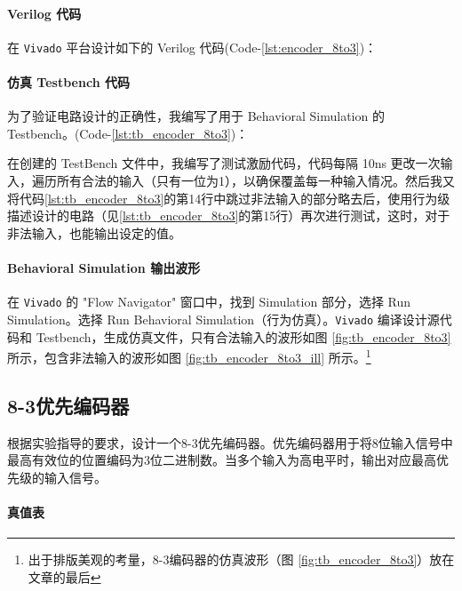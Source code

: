 \documentclass[10pt,a4paper,twoside]{rho-class/rho}
\begin{document}
        \paragraph{Verilog 代码} 
            在 \verb|Vivado| 平台设计如下的 Verilog 代码(Code-\ref{lst:encoder_8to3})：
                

        
        \paragraph{仿真 Testbench 代码}
            为了验证电路设计的正确性，我编写了用于 Behavioral Simulation 的 Testbench。(Code-\ref{lst:tb_encoder_8to3})：
                
                
            在创建的 TestBench 文件中，我编写了测试激励代码，代码每隔 10ns 更改一次输入，遍历所有合法的输入（只有一位为1），以确保覆盖每一种输入情况。然后我又将代码\ref{lst:tb_encoder_8to3}的第14行中跳过非法输入的部分略去后，使用行为级描述设计的电路（见\ref{lst:tb_encoder_8to3}的第15行）再次进行测试，这时，对于非法输入，也能输出设定的值。
        
        \paragraph{Behavioral Simulation 输出波形}
            在 \verb|Vivado| 的 "Flow Navigator" 窗口中，找到 Simulation 部分，选择 Run Simulation。选择 Run Behavioral Simulation（行为仿真）。\verb|Vivado| 编译设计源代码和 Testbench，生成仿真文件，只有合法输入的波形如图 \ref{fig:tb_encoder_8to3} 所示，包含非法输入的波形如图 \ref{fig:tb_encoder_8to3_ill} 所示。\footnote{出于排版美观的考量，8-3编码器的仿真波形（图 \ref{fig:tb_encoder_8to3}）放在文章的最后}
        

        
    \subsection{8-3优先编码器}

            根据实验指导的要求，设计一个8-3优先编码器。优先编码器用于将8位输入信号中最高有效位的位置编码为3位二进制数。当多个输入为高电平时，输出对应最高优先级的输入信号。
        
        \paragraph{真值表}
        
\end{document}
